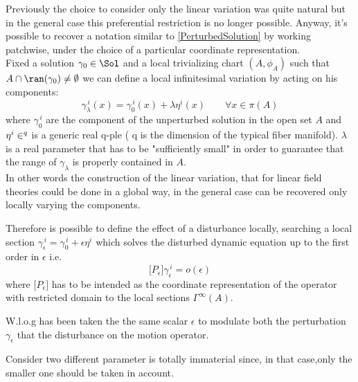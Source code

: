 \documentclass[Main]{subfiles}
\begin{document}
		Previously the choice to consider only the linear variation was quite natural but in the general case this preferential restriction is no longer possible.
		Anyway, it's possible to  recover a notation similar to \ref{PerturbedSolution} by working patchwise, under the choice of a particular coordinate representation.
		\\
		Fixed a solution $\gamma_0 \in \Sol$ and a local trivializing chart $(A, \phi_A)$ such that $A\cap \ran(\gamma_0) \neq \emptyset$ we can define a local infinitesimal variation by acting on his components:
		\begin{displaymath}
			\gamma_\lambda ^{\, i}(x) = \gamma_0^{\, i}(x) + \lambda \eta^i(x) \qquad \forall x\in \pi(A)
		\end{displaymath}
		where $ \gamma_0^{\, i}$ are the component of the unperturbed solution in the open set $A$ and $\eta^i\in \real^q$ is a generic real q-ple ( q is the dimension of the typical fiber manifold).
		$\lambda$ is a real parameter that has to be "sufficiently small" in order to guarantee that the range of $\gamma_\lambda$ is properly contained in $A$.
		\\
		In other words the construction of the linear variation, that for linear field theories could be done in a global way, in the general case can be recovered only locally varying the components.
		
		Therefore is possible to define the effect of a disturbance locally, searching a local section $\gamma_\epsilon^{\, i} = \gamma_0^{\, i} + \epsilon \eta^{i}$ which solves  the disturbed dynamic equation up to the first order in $\epsilon$ i.e. 
		\begin{displaymath}
			\big[ P_\epsilon \big] \gamma_\epsilon^{\,i} = o(\epsilon)
		\end{displaymath}
		where $\big[ P_\epsilon \big] $ has to be intended as the coordinate representation of the operator with restricted domain to the local sections $\Gamma^\infty(A)$.
		\begin{observation}
		W.l.o.g has been taken the the same scalar $\epsilon$  to modulate both the perturbation $\gamma_\epsilon$ that the disturbance on the motion operator.
		
		Consider two different parameter is totally immaterial since, in that case,only the smaller one should be taken in account.
		\end{observation}
\end{document}
